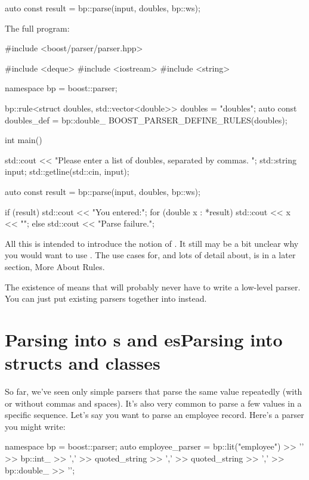 \documentclass{MyBook}
\begin{document}
\begin{code}
auto const result = bp::parse(input, doubles, bp::ws);
\end{code}

The full program:

\begin{code}
#include <boost/parser/parser.hpp>

#include <deque>
#include <iostream>
#include <string>


namespace bp = boost::parser;


bp::rule<struct doubles, std::vector<double>> doubles = "doubles";
auto const doubles_def = bp::double_ %
BOOST_PARSER_DEFINE_RULES(doubles);

int main()
{
    std::cout << "Please enter a list of doubles, separated by commas. ";
    std::string input;
    std::getline(std::cin, input);

    auto const result = bp::parse(input, doubles, bp::ws);

    if (result) {
        std::cout << "You entered:\n";
        for (double x : *result) {
            std::cout << x << "\n";
        }
    } else {
        std::cout << "Parse failure.\n";
    }
}
\end{code}

All this is intended to introduce the notion of . It still may be a bit unclear why you would want to use . The use cases for, and lots of detail about,  is in a later section, More About Rules.

\begin{marker}[title=Note ]
The existence of  means that will probably never have to write a low-level parser. You can just put existing parsers together into  instead. 
\end{marker}

\section{{Parsing into s and es}{Parsing into structs and classes}}

So far, we've seen only simple parsers that parse the same value repeatedly (with or without commas and spaces). It's also very common to parse a few values in a specific sequence. Let's say you want to parse an employee record. Here's a parser you might write:

\begin{code}
namespace bp = boost::parser;
auto employee_parser = bp::lit("employee")
    >> '{'
    >> bp::int_ >> ','
    >> quoted_string >> ','
    >> quoted_string >> ','
    >> bp::double_
    >> '}';
\end{code}
\end{document}
